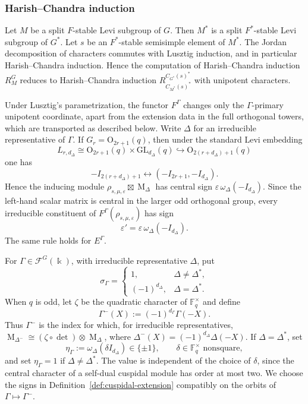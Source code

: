 \documentclass[12pt]{amsart}
\numberwithin{itemcounter}{subsection}
\theoremstyle{plain}
\theoremstyle{definition}
\theoremstyle{remark}
\numberwithin{equation}{section}
\def\bbF{\mathbb{F}}
\def\k{\Bbbk}
\def\O{\mathrm{O}}
\def\GL{\mathrm{GL}}
\def\M{{\operatorname{M}\nolimits}}
\begin{document}
\subsubsection{Harish--Chandra induction}

Let $M$ be a split
$F$-stable Levi subgroup of $G$. Then $M^*$ is a split $F^*$-stable Levi subgroup
of $G^*$. Let $s$ be an $F^*$-stable semisimple element of $M^*$.
The Jordan decomposition of characters
 commutes with Lusztig induction, and in particular Harish--Chandra induction.
 Hence the computation of Harish--Chandra induction $R_{M}^G$
 reduces to Harish--Chandra induction
 $R_{C_{M^*}(s)^*}^{C_{G^*}(s)^*}$ with unipotent characters.

Under Lusztig's parametrization, the functor \(F^\Gamma\) changes only the
\(\Gamma\)-primary unipotent coordinate, apart from the extension data in the
full orthogonal towers, which are transported as described below.  Write
\(\Delta\) for an irreducible representative of \(\Gamma\).  If
\(G_r=\O_{2r+1}(q)\), then under the standard Levi embedding
\[
 L_{r,d_\Delta}\cong\O_{2r+1}(q)\times\GL_{d_\Delta}(q)
 \hookrightarrow\O_{2(r+d_\Delta)+1}(q)
\]
one has
\[
 -I_{2(r+d_\Delta)+1}
 \longleftrightarrow
 (-I_{2r+1},-I_{d_\Delta}).
\]
Hence the inducing module \(\rho_{s,\mu,\varepsilon}\boxtimes\M_\Delta\)
has central sign \(\varepsilon\,\omega_\Delta(-I_{d_\Delta})\).  Since the left-hand
scalar matrix is central in the larger odd orthogonal group, every irreducible
constituent of \(F^\Gamma(\rho_{s,\mu,\varepsilon})\) has sign
\begin{equation}\label{eq:Oodd-sign-transport}
 \varepsilon' = \varepsilon\,\omega_\Delta(-I_{d_\Delta}).
\end{equation}
The same rule holds for \(E^\Gamma\).

For $\Gamma\in\mathcal F^G(\k)$, with irreducible representative $\Delta$, put
\[
 \sigma_\Gamma=
 \begin{cases}
  1,&\Delta\ne\Delta^*,\\
  (-1)^{d_\Delta},&\Delta=\Delta^*.
 \end{cases}
\]
When $q$ is odd, let $\zeta$ be the quadratic character of
$\bbF_q^\times$ and define
\[
 \Gamma^-(X):=(-1)^{d_\Gamma}\Gamma(-X).
\]
Thus $\Gamma^-$ is the index for which, for irreducible representatives,
\(\M_{\Delta^-}\cong(\zeta\circ\det)\otimes\M_\Delta\), where
\(\Delta^-(X)=(-1)^{d_\Delta}\Delta(-X)\).  If $\Delta=\Delta^*$, set
\[
 \eta_\Gamma:=\omega_\Delta(\delta I_{d_\Delta})\in\{\pm1\},
 \qquad \delta\in\bbF_q^\times\text{ nonsquare},
\]
and set $\eta_\Gamma=1$ if $\Delta\ne\Delta^*$.  The value is independent
of the choice of $\delta$, since the central character of a self-dual
cuspidal module has order at most two.  We choose the signs in
Definition~\ref{def:cuspidal-extension} compatibly on the orbits of
$\Gamma\mapsto\Gamma^-$.
\end{document}
